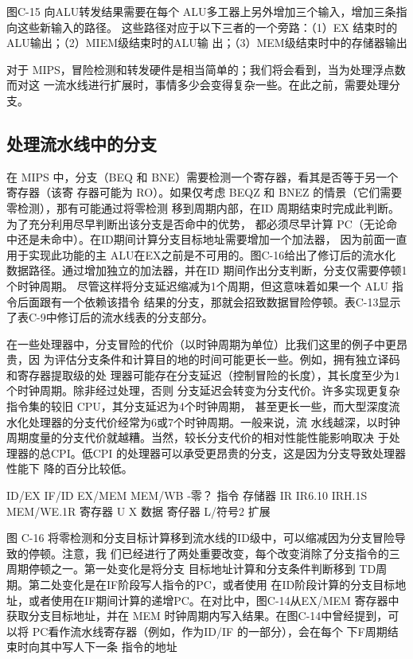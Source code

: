 图C-15
向ALU转发结果需要在每个 ALU多工器上另外增加三个输入，增加三条指向这些新输入的路径。
这些路径对应于以下三者的一个旁路：（1）EX 结束时的ALU输出；（2）MIEM级结束时的ALU输
出；（3）MEM级结束时中的存储器输出

对于 MIPS，冒险检测和转发硬件是相当简单的；我们将会看到，当为处理浮点数而对这
一流水线进行扩展时，事情多少会变得复杂一些。在此之前，需要处理分支。

\subsection{处理流水线中的分支}
在 MIPS 中，分支（BEQ 和 BNE）需要检测一个寄存器，看其是否等于另一个寄存器（该寄
存器可能为 RO）。如果仅考虑 BEQZ 和 BNEZ 的情景（它们需要零检测），那有可能通过将零检测
移到周期内部，在ID 周期结束时完成此判断。为了充分利用尽早判断出该分支是否命中的优势，
都必须尽早计算 PC（无论命中还是未命中）。在ID期间计算分支目标地址需要增加一个加法器，
因为前面一直用于实现此功能的主 ALU在EX之前是不可用的。图C-16给出了修订后的流水化
数据路径。通过增加独立的加法器，并在ID 期间作出分支判断，分支仅需要停顿1个时钟周期。
尽管这样将分支延迟缩减为1个周期，但这意味着如果一个 ALU 指令后面跟有一个依赖该措令
结果的分支，那就会招致数据冒险停顿。表C-13显示了表C-9中修订后的流水线表的分支部分。

在一些处理器中，分支冒险的代价（以时钟周期为单位）比我们这里的例子中更昂贵，因
为评估分支条件和计算目的地的时间可能更长一些。例如，拥有独立译码和寄存器提取级的处
理器可能存在分支延迟（控制冒险的长度），其长度至少为1个时钟周期。除非经过处理，否则
分支延迟会转变为分支代价。许多实现更复杂指令集的较旧 CPU，其分支延迟为4个时钟周期，
甚至更长一些，而大型深度流水化处理器的分支代价经常为6或7个时钟周期。一般来说，流
水线越深，以时钟周期度量的分支代价就越糟。当然，较长分支代价的相对性能性能影响取决
于处理器的总CPI。低CPI 的处理器可以承受更昂贵的分支，这是因为分支导致处理器性能下
降的百分比较低。

ID/EX
IF/ID
EX/MEM
MEM/WB
-零？
指令
存储器
IR
IR6.10
IRH.1S
MEM/WE.1R 寄存器
U
X
数据
寄仔器
L/符号2
扩展

图 C-16 将零检测和分支目标计算移到流水线的ID级中，可以缩减因为分支冒险导致的停顿。注意，我
们已经进行了两处重要改变，每个改变消除了分支指令的三周期停顿之一。第一处变化是将分支
目标地址计算和分支条件判断移到 TD周期。第二处变化是在IF阶段写人指令的PC，或者使用
在ID阶段计算的分支目标地址，或者使用在IF期间计算的递增PC。在对比中，图C-14从EX/MEM
寄存器中获取分支目标地址，并在 MEM 时钟周期内写入结果。在图C-14中曾经提到，可以将
PC看作流水线寄存器（例如，作为ID/IF 的一部分），会在每个 下F周期结束时向其中写人下一条
指令的地址

